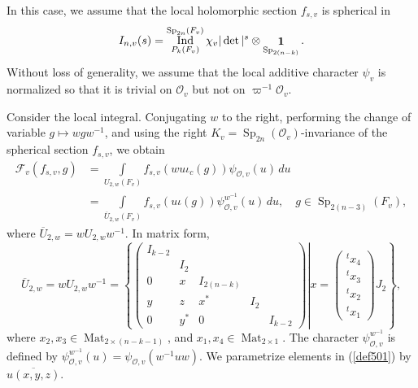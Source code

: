 \documentclass[11pt,notitlepage]{amsart}
\theoremstyle{definition}
\theoremstyle{remark}
\newcommand{\calF}{\mathcal{F}}
\newcommand{\calO}{\mathcal{O}}
\DeclareMathOperator{\id}{{\bf 1}}
\DeclareMathOperator{\Sp}{Sp}
\DeclareMathOperator{\Mat}{Mat}
\DeclareMathOperator{\Ind}{Ind}
\begin{document}
In this case, we assume that the local holomorphic section $f_{s,v}$ is spherical in 
\begin{equation}
  I_{n,v}(s) = \Ind_{P_k(F_v)}^{\Sp_{2n}(F_v)}\chi_v|\det|^s\otimes \id_{\Sp_{2(n-k)}}.
\end{equation}
Without loss of generality, we assume that the local additive character $\psi_v$ is normalized so that it is trivial on $\calO_v$ but not on $\varpi^{-1}\calO_v$. 

\medskip
Consider the local integral. Conjugating $w$ to the right, performing the change of variable $g\mapsto wgw^{-1}$, and using the right $K_v=\Sp_{2n}(\calO_v)$-invariance of the spherical section $f_{s,v}$, we obtain
\begin{equation}\label{int501}
  \begin{split}
    \calF_v(f_{s,v},g) &= \int\limits_{U_{2,w}(F_v)}f_{s,v}(w u\iota_{c}(g))\psi_{\calO,v}(u)\,du\\
    &=\int\limits_{\overline{U}_{2,w}(F_v)}f_{s,v}(u\iota(g))\psi^{w^{-1}}_{\calO,v}(u)\,du, \quad g\in \Sp_{2(n-3)}(F_v),
  \end{split}
\end{equation}
where $\overline{U}_{2,w}=wU_{2,w}w^{-1}$. In matrix form,
\begin{equation}\label{def501}
  \overline{U}_{2,w} = w U_{2,w}w^{-1} 
  = \left.\left\{ \begin{pmatrix} 
    I_{k-2}&&&&\\
    &I_2&&&\\
    0&x&I_{2(n-k)}&&\\
    y&z&x^\ast&I_2&\\
    0&y^\ast&0&&I_{k-2}
  \end{pmatrix} \right\vert x = \begin{pmatrix} {}^tx_4 \\ {}^tx_3 \\ {}^tx_2 \\ {}^tx_1 \end{pmatrix} J_2 \right\},
\end{equation}
where $x_2,x_3\in \Mat_{2\times (n-k-1)}$, and $x_1,x_4\in \Mat_{2\times 1}$. The character $\psi_{\calO,v}^{w^{-1}}$ is defined by
$\psi_{\calO,v}^{w^{-1}} (u) = \psi_{\calO,v}(w^{-1}uw).$ We parametrize elements in (\ref{def501}) by $\overline{u(x,y,z)}$.
\end{document}

